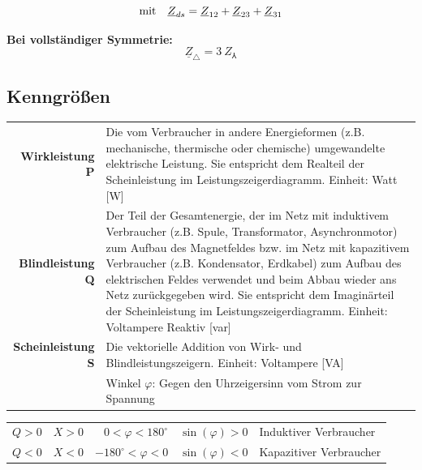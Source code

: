 \documentclass[a4paper, 11pt]{article}
\begin{document}
\begin{spacing}{0.1}
\begin{multicols}{2}
\[
	\textnormal{mit} \quad \underline{Z}_{ds}=\underline{Z}_{12} + \underline{Z}_{23} + \underline{Z}_{31}
\]
\end{multicols}

\vspace{1.5em}
\sffamily\textbf{Bei vollständiger Symmetrie:}
\[
	\underline Z_\triangle = 3 ~ Z_\Yup
\]

\newpage
\rmfamily

\subsection*{Kenngrößen}
\begin{center}
\bgroup
\begin{longtable}{r p{12cm}}
	\textbf{Wirkleistung P} & Die vom Verbraucher in andere Energieformen (z.B. mechanische, thermische oder chemische) umgewandelte elektrische Leistung. Sie entspricht dem Realteil der Scheinleistung im Leistungszeigerdiagramm. \newline Einheit: Watt [W] \\
	[2mm]
	\textbf{Blindleistung Q} & Der Teil der Gesamtenergie, der im Netz mit induktivem Verbraucher (z.B. Spule, Transformator, Asynchronmotor) zum Aufbau des Magnetfeldes bzw. im Netz mit kapazitivem Verbraucher (z.B. Kondensator, Erdkabel) zum Aufbau des elektrischen Feldes verwendet und beim Abbau wieder ans Netz zurückgegeben wird. Sie entspricht dem Imaginärteil der Scheinleistung im Leistungszeigerdiagramm.\newline
	Einheit: Voltampere Reaktiv [var] \\
	[2mm]
	\textbf{Scheinleistung S} & Die vektorielle Addition von Wirk- und Blindleistungszeigern.\newline
	Einheit: Voltampere [VA] \\
	[2mm]
	\pbox{20cm}{\textbf{Phasenverschiebung}} & Winkel $\varphi$: Gegen den Uhrzeigersinn vom Strom zur Spannung \\
\end{longtable}
\egroup
\end{center}
\begin{table}[H]
\centering
\begin{mdframed}[leftmargin=10pt,rightmargin=10pt]
\begin{tabular}{r | r | r | r | l}
	$Q > 0$ & $X > 0$ & $0 < \varphi < 180^\circ$ & $\sin(\varphi) > 0$ & Induktiver Verbraucher \\
	$Q < 0$ & $X < 0$ & $-180^\circ < \varphi < 0$ & $\sin(\varphi) < 0$ & Kapazitiver Verbraucher
\end{tabular}
\end{mdframed}
\end{table}


\end{spacing}
\end{document}
